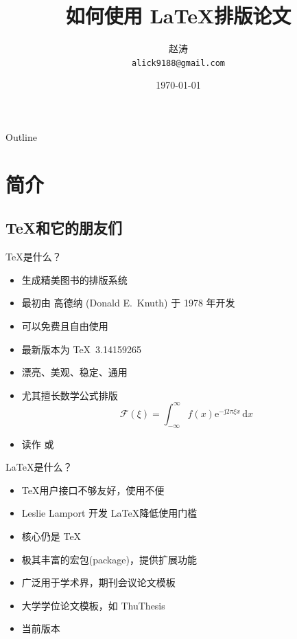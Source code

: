 \documentclass{beamer}
\title
{如何使用 \LaTeX 排版论文}
\author[alick9188] %
{赵涛\\ \texttt{alick9188@gmail.com}}
\institute[GitHub] %
{
  清华大学电子系网络融合实验室
}
\date[图书馆专题培训讲座] %
{\today}
\begin{document}
\begin{frame}
  \titlepage
\end{frame}

\begin{frame}{Outline}
  \tableofcontents
\end{frame}




\section{简介}

\subsection{\TeX 和它的朋友们}

\begin{frame}[fragile]{\TeX 是什么？}
  \begin{itemize}
    \item 生成精美图书的排版系统
    \item 最初由 高德纳 (Donald E.~Knuth) 于 1978 年开发
    \item 可以免费且自由使用
    \item 最新版本为 \TeX\ 3.14159265
    \item 漂亮、美观、稳定、通用
    \item 尤其擅长数学公式排版
      \begin{equation}
        \mathcal{F}(\xi)=\int_{-\infty}^{\infty}
        f(x)\mathrm{e}^{-\mathrm{j}2\pi \xi x}\,\mathrm{d}x
      \end{equation}
    \item 读作  或 
  \end{itemize}
\end{frame}

\begin{frame}{\LaTeX 是什么？}
  \begin{itemize}
    \item \TeX 用户接口不够友好，使用不便
    \item Leslie Lamport 开发 \LaTeX 降低使用门槛
    \item 核心仍是 \TeX
    \item 极其丰富的宏包(package)，提供扩展功能
    \item 广泛用于学术界，期刊会议论文模板
    \item 大学学位论文模板，如 ThuThesis
    \item 当前版本 \LaTeXe
  \end{itemize}
\end{frame}
\end{document}
